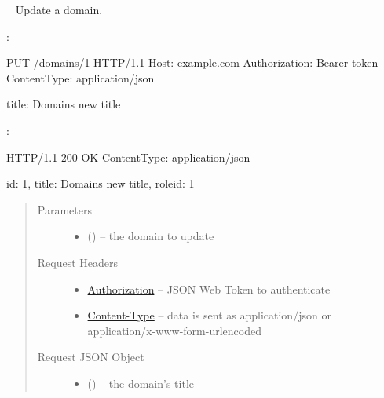 \documentclass[letterpaper,10pt,english]{sphinxmanual}
\begin{document}
\begin{fulllineitems}
\label{\detokenize{resources/domain:put--domains-(domain_id)}}~
Update a domain.

:

\begin{sphinxVerbatim}[commandchars=\\\{\}]
PUT /domains/1 HTTP/1.1
Host: example.com
Authorization: Bearer \PYGZlt{}token\PYGZgt{}
Content\PYGZhy{}Type: application/json

\PYGZob{}
    \PYGZsq{}title\PYGZsq{}: \PYGZsq{}Domain\PYGZsq{}s new title\PYGZsq{}
\PYGZcb{}
\end{sphinxVerbatim}

:

\begin{sphinxVerbatim}[commandchars=\\\{\}]
HTTP/1.1 200 OK
Content\PYGZhy{}Type: application/json

\PYGZob{}
    \PYGZsq{}id\PYGZsq{}: 1,
    \PYGZsq{}title\PYGZsq{}: \PYGZsq{}Domain\PYGZsq{}s new title\PYGZsq{},
    \PYGZsq{}role\PYGZus{}id\PYGZsq{}: 1
\PYGZcb{}
\end{sphinxVerbatim}
\begin{quote}\begin{description}
\item[{Parameters}] \leavevmode\begin{itemize}
\item {} 
 () -- the domain to update

\end{itemize}

\item[{Request Headers}] \leavevmode\begin{itemize}
\item {} 
\href{http://tools.ietf.org/html/rfc7235\#section-4.2}{Authorization} -- JSON Web Token to authenticate

\item {} 
\href{http://tools.ietf.org/html/rfc7231\#section-3.1.1.5}{Content-Type} -- data is sent as application/json or
application/x-www-form-urlencoded

\end{itemize}

\item[{Request JSON Object}] \leavevmode\begin{itemize}
\item {} 
 () -- the domain's title


\end{itemize}
\end{description}
\end{quote}
\end{fulllineitems}
\end{document}
